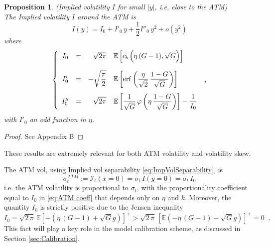 \documentclass[12pt]{article}
\newtheorem{proposition}[theorem]{Proposition}
\theoremstyle{definition}
\theoremstyle{remark}
\numberwithin{theorem}{section}
\numberwithin{proposition}{section}
\numberwithin{lemma}{section}
\numberwithin{corollary}{section}
\numberwithin{definition}{section}
\numberwithin{remark}{section}
\numberwithin{example}{section}
\newcommand{\E}{\mathbb{E}}
\newcommand{\be}{\begin{equation}}
\newcommand{\en}{\end{equation}}
\begin{document}
\begin{proposition} {\rm (Implied volatility  ${ I}$ for small $|y|$, i.e. close to the ATM)} \label{pr:ATMVolSkew}\\
The Implied volatility  ${ I}$ around the ATM is
\[
{ I}({ y}) = { I}_0 +  { I}'_0 \, { y} + \frac{1}{2} { I}''_0 \, { y^2} +  o({ y^2}) 
\]
where
\be
\left\{
\begin{array} {ccrl}
 { I}_0 & = & 
\sqrt{2 \pi}  & \E \left[  c_b\left(  {\eta} \, (G - 1) , \sqrt{G}\right)  \right] \\[5mm]
 { I}'_0 
 & = & \displaystyle - \sqrt{\frac{\pi}{2}} & \displaystyle \E \left[ {\rm erf} \left(  \frac{  {\eta}}{\sqrt{2}} \, \frac{  1 - G }{  \sqrt{G}} \right) \right] \\[5mm]
{ I}''_0 
 & = & \displaystyle \sqrt{2 \pi} & \displaystyle 
 \E \left[ \frac{1}{  \sqrt{G}} \, \varphi \left(  {\eta} \, \frac{  1 - G }{  \sqrt{G}} \right) \right] - \frac{1}{I_0}
\label{eq:ATM coeff}
\end{array}
\right.  \; ,
\en
with $I'_0$ an odd function in $\eta$.
\end{proposition}
\begin{proof}
    See Appendix B
\end{proof}

\bigskip

These results are extremely relevant for both ATM volatility and volatility skew. 

The ATM vol, using Implied vol separability \eqref{eq:ImpVolSeparability}, is
\be
\sigma^{ATM}_t := \mathcal{I}_t (x=0) =  \sigma_t \, I (y=0) = \sigma_t \, I_0
\label{eq:ATMvol}
\en
i.e. the ATM volatility is proportional to $\sigma_t$, with the proportionality coefficient equal 
to ${ I}_0$ in \eqref{eq:ATM coeff} that depends only on $\eta$ and $k$.
Moreover, the quantity $ { I}_0$ is strictly positive due to the Jensen inequality
\[
  I_0 = \sqrt{2 \, \pi}  \, \E \left[  - (\eta \, (G-1) + \sqrt{G} g) \right]^+ > \sqrt{2 \, \pi} \, \left[ \E  (- \eta \, (G-1) - \sqrt{G} g) \right]^+ = 0 \; \; .
\]
This fact will play a key role in the model calibration scheme, as discussed in Section \ref{sec:Calibration}.
\end{document}
